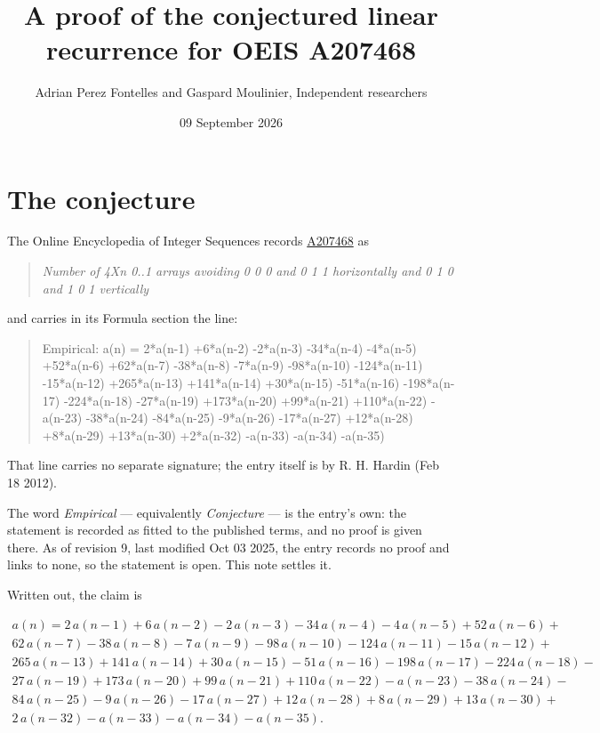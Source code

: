\documentclass[11pt]{article}
\title{A proof of the conjectured linear recurrence for OEIS A207468}
\author{Adrian Perez Fontelles and Gaspard Moulinier, Independent researchers}
\date{09 September 2026}
\theoremstyle{definition}
\begin{document}
\maketitle
\section{The conjecture}

The Online Encyclopedia of Integer Sequences records \href{https://oeis.org/A207468}{A207468} as

\begin{quote}\itshape Number of 4Xn 0..1 arrays avoiding 0 0 0 and 0 1 1 horizontally and 0 1 0 and 1 0 1 vertically\end{quote}

and carries in its Formula section the line:

\begin{quote}\ttfamily Empirical: a(n) = 2*a(n-1) +6*a(n-2) -2*a(n-3) -34*a(n-4) -4*a(n-5) +52*a(n-6) +62*a(n-7) -38*a(n-8) -7*a(n-9) -98*a(n-10) -124*a(n-11) -15*a(n-12) +265*a(n-13) +141*a(n-14) +30*a(n-15) -51*a(n-16) -198*a(n-17) -224*a(n-18) -27*a(n-19) +173*a(n-20) +99*a(n-21) +110*a(n-22) -a(n-23) -38*a(n-24) -84*a(n-25) -9*a(n-26) -17*a(n-27) +12*a(n-28) +8*a(n-29) +13*a(n-30) +2*a(n-32) -a(n-33) -a(n-34) -a(n-35)\end{quote}

That line carries no separate signature; the entry itself is by R. H. Hardin (Feb 18 2012).

The word {\itshape Empirical} --- equivalently {\itshape Conjecture} --- is the entry's own: the statement is recorded as fitted to the published terms, and no proof is given there. As of revision 9, last modified Oct 03 2025, the entry records no proof and links to none, so the statement is open. This note settles it.

Written out, the claim is

\begin{multline*} a(n) = 2\,a(n-1) + 6\,a(n-2) - 2\,a(n-3) - 34\,a(n-4) - 4\,a(n-5) + 52\,a(n-6) + \\ 62\,a(n-7) - 38\,a(n-8) - 7\,a(n-9) - 98\,a(n-10) - 124\,a(n-11) - 15\,a(n-12) + \\ 265\,a(n-13) + 141\,a(n-14) + 30\,a(n-15) - 51\,a(n-16) - 198\,a(n-17) - 224\,a(n-18) - \\ 27\,a(n-19) + 173\,a(n-20) + 99\,a(n-21) + 110\,a(n-22) - a(n-23) - 38\,a(n-24) - \\ 84\,a(n-25) - 9\,a(n-26) - 17\,a(n-27) + 12\,a(n-28) + 8\,a(n-29) + 13\,a(n-30) + \\ 2\,a(n-32) - a(n-33) - a(n-34) - a(n-35). \end{multline*}
\end{document}
